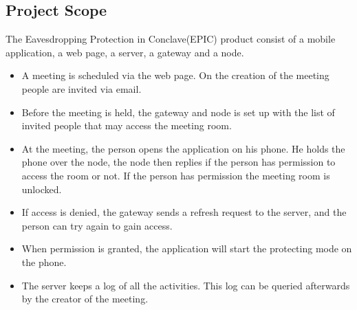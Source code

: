 	\subsection{Project Scope}
		The Eavesdropping Protection in Conclave(EPIC) product consist of a mobile application, a web page, a server, a gateway and a node. 
		\begin{itemize}
		\item A meeting is scheduled via the web page. On the creation of the meeting people are invited via email.
		\item Before the meeting is held, the gateway and node is set up with the list of invited people that may access the meeting room.
		\item At the meeting, the person opens the application on his phone. He holds the phone over the node, the node then replies if the person has permission to access the room or not. If the person has permission the meeting room is unlocked.
		\item If access is denied, the gateway sends a refresh request to the server, and the person can try again to gain access.
		\item When permission is granted, the application will start the protecting mode on the phone.
		\item The server keeps a log of all the activities. This log can be queried afterwards by the creator of the meeting.
        \end{itemize}











	


\newpage


